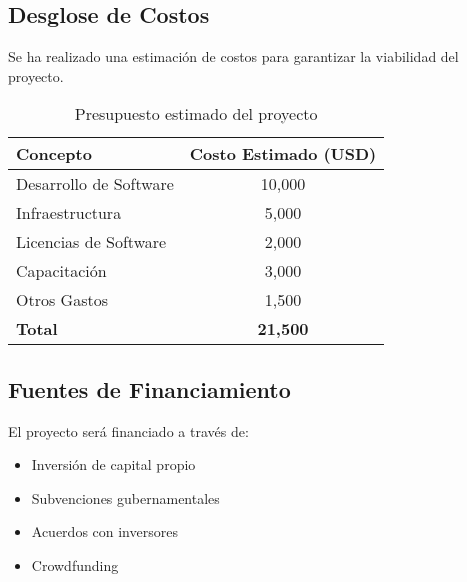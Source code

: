 \subsection{Desglose de Costos}
Se ha realizado una estimación de costos para garantizar la viabilidad del proyecto.

\begin{table}[h]
	\centering
	\begin{tabular}{|l|c|}
		\hline
		\textbf{Concepto} & \textbf{Costo Estimado (USD)} \\ \hline
		Desarrollo de Software & 10,000 \\ \hline
		Infraestructura & 5,000 \\ \hline
		Licencias de Software & 2,000 \\ \hline
		Capacitación & 3,000 \\ \hline
		Otros Gastos & 1,500 \\ \hline
		\textbf{Total} & \textbf{21,500} \\ \hline
	\end{tabular}
	\caption{Presupuesto estimado del proyecto}
\end{table}

\subsection{Fuentes de Financiamiento}
El proyecto será financiado a través de:

\begin{itemize}
	\item Inversión de capital propio
	\item Subvenciones gubernamentales
	\item Acuerdos con inversores
	\item Crowdfunding
\end{itemize}
